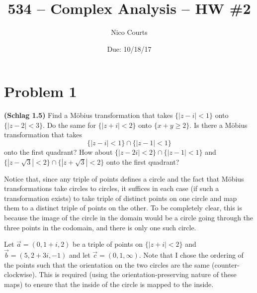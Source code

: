 \documentclass[12pt]{article}
\begin{document}
\title{534 -- Complex Analysis -- HW \#2\vspace{-2ex}}
\author{Nico Courts}
\date{Due: 10/18/17}
\maketitle


\section*{Problem 1}
	\begin{spacing}{1}
		\textbf{(Schlag 1.5)} Find a M\"obius transformation that takes $\{|z-i|<1\}$ onto $\{|z-2|<3\}$. Do the same for $\{|z+i|<2\}$ onto $\{x+y\ge 2\}$. Is there a M\"obius transformation that takes
		\[\{|z-i|<1\}\cap\{|z-1|<1\}\]
		onto the first quadrant? How about $\{|z-2i|<2\}\cap\{|z-1|<1\}$ and $\{|z-\sqrt{3}|<2\}\cap\{|z+\sqrt{3}|<2\}$ onto the first quadrant?
	\end{spacing}	
	\noindent\hrulefill	
	
	Notice that, since any triple of points defines a circle and the fact that M\"obius transformations take circles to circles, it suffices in each case (if such a transformation exists) to take triple of distinct points on one circle and map them to a distinct triple of points on the other. To be completely clear, this is because the image of the circle in the domain would be a circle going through the three points in the codomain, and there is only one such circle.
	
	Let $\vec a=(0,1+i,2)$ be a triple of points on $\{|z+i|<2\}$ and $\vec b=(5,2+3i,-1)$ and let $\vec c=(0,1,\infty)$. Note that I chose the ordering of the points such that the orientation on the two circles are the same (counter-clockwise). This is required (using the orientation-preserving nature of these maps) to ensure that the inside of the circle is mapped to the inside. 
	
\end{document}
